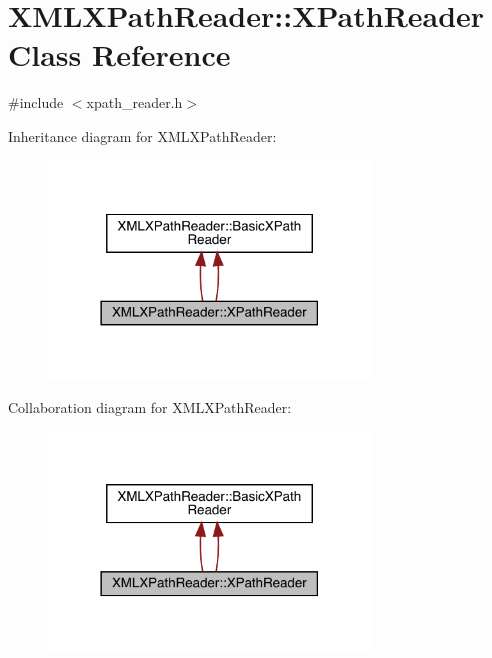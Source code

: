 \hypertarget{classXMLXPathReader_1_1XPathReader}{}\section{X\+M\+L\+X\+Path\+Reader\+:\+:X\+Path\+Reader Class Reference}
\label{classXMLXPathReader_1_1XPathReader}


{\ttfamily \#include $<$xpath\+\_\+reader.\+h$>$}



Inheritance diagram for X\+M\+L\+X\+Path\+Reader\+:\nopagebreak
\begin{figure}[H]
\begin{center}
\leavevmode
\includegraphics[width=242pt]{d8/dcd/classXMLXPathReader_1_1XPathReader__inherit__graph}
\end{center}
\end{figure}


Collaboration diagram for X\+M\+L\+X\+Path\+Reader\+:\nopagebreak
\begin{figure}[H]
\begin{center}
\leavevmode
\includegraphics[width=242pt]{d4/d59/classXMLXPathReader_1_1XPathReader__coll__graph}
\end{center}
\end{figure}
